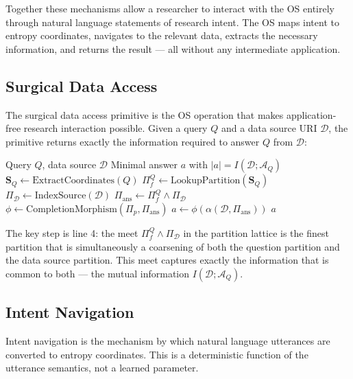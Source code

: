 \documentclass[12pt,twocolumn]{article}
\begin{document}
Together these mechanisms allow a researcher to interact with the OS entirely through natural language statements of research intent. The OS maps intent to entropy coordinates, navigates to the relevant data, extracts the necessary information, and returns the result --- all without any intermediate application.

\subsection{Surgical Data Access}

The surgical data access primitive is the OS operation that makes application-free research interaction possible. Given a query $Q$ and a data source URI $\mathcal{D}$, the primitive returns exactly the information required to answer $Q$ from $\mathcal{D}$:

\begin{algorithm}[H]
\caption{Surgical Data Access}
\label{alg:surgical}
\begin{algorithmic}[1]
\Require Query $Q$, data source $\mathcal{D}$
\Ensure Minimal answer $a$ with $|a| = I(\mathcal{D}; \mathcal{A}_Q)$
\State $\mathbf{S}_Q \leftarrow \text{ExtractCoordinates}(Q)$
\State $\Pi_f^Q \leftarrow \text{LookupPartition}(\mathbf{S}_Q)$ 
\State $\Pi_{\mathcal{D}} \leftarrow \text{IndexSource}(\mathcal{D})$ 
\State $\Pi_{\text{ans}} \leftarrow \Pi_f^Q \wedge \Pi_{\mathcal{D}}$ 
\State $\phi \leftarrow \text{CompletionMorphism}(\Pi_p, \Pi_{\text{ans}})$
\State $a \leftarrow \phi(\alpha(\mathcal{D}, \Pi_{\text{ans}}))$
\Return $a$
\end{algorithmic}
\end{algorithm}

The key step is line 4: the meet $\Pi_f^Q \wedge \Pi_{\mathcal{D}}$ in the partition lattice is the finest partition that is simultaneously a coarsening of both the question partition and the data source partition. This meet captures exactly the information that is common to both --- the mutual information $I(\mathcal{D}; \mathcal{A}_Q)$.

\subsection{Intent Navigation}

Intent navigation is the mechanism by which natural language utterances are converted to entropy coordinates. This is a deterministic function of the utterance semantics, not a learned parameter.
\end{document}
